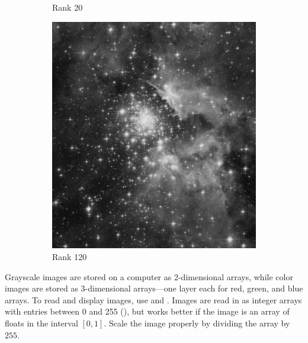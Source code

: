 \begin{figure}[H]
\begin{subfigure}{.32\textwidth}
    \caption{Rank 20}
    \label{fig:hubble-rank20-approximation}
\end{subfigure}
%
\begin{subfigure}{.32\textwidth}
    \centering
    \includegraphics[width=\textwidth]{figures/rank120.pdf}
    \caption{Rank 120}
\end{subfigure}
\caption{}
\label{fig:hubble-svd-rank-approximations}
\end{figure}

Grayscale images are stored on a computer as 2-dimensional arrays, while color images are stored as 3-dimensional arrays---one layer each for red, green, and blue arrays.
To read and display images, use  and .
Images are read in as integer arrays with entries between 0 and 255 (), but  works better if the image is an array of floats in the interval $[0,1]$.
Scale the image properly by dividing the array by $255$.


